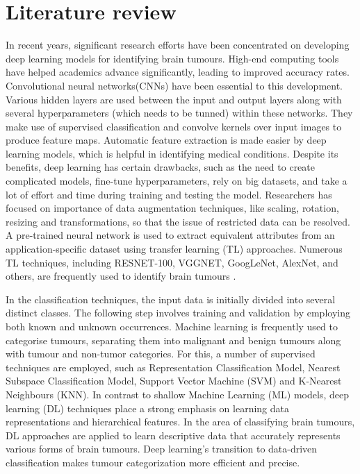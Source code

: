 \documentclass[12pt, a4paper,twoside]{report}
\theoremstyle{plain} %
\theoremstyle{definition} %
\theoremstyle{remark} %
\numberwithin{equation}{chapter}
\begin{document}
\chapter{Literature review}\label{ch:2}

In recent years, significant research efforts have been concentrated on developing deep learning models for identifying brain tumours. High-end computing tools have helped academics advance significantly, leading to improved accuracy rates. Convolutional neural networks(CNNs) have been essential to this development. Various hidden layers are used between the input and output layers along with several hyperparameters (which needs to be tunned) within these networks. They make use of supervised classification and convolve kernels over input images to produce feature maps. Automatic feature extraction is made easier by deep learning models, which is helpful in identifying medical conditions. Despite its benefits, deep learning has certain drawbacks, such as the need to create complicated models, fine-tune hyperparameters, rely on big datasets, and take a lot of effort and time during training and testing the model. Researchers has focused on importance of data augmentation techniques, like scaling, rotation, resizing and transformations, so that the issue of restricted data can be resolved. A pre-trained neural network is used to extract equivalent attributes from an application-specific dataset using transfer learning (TL) approaches. Numerous TL techniques, including RESNET-100, VGGNET, GoogLeNet, AlexNet, and others, are frequently used to identify brain tumours \cite{lakshmi22}.

In the classification techniques, the input data is initially divided into several distinct classes. The following step involves training and validation by employing both known and unknown occurrences. Machine learning is frequently used to categorise tumours, separating them into malignant and benign tumours along with tumour and non-tumor categories. For this, a number of supervised techniques are employed, such as Representation Classification Model, Nearest Subspace Classification Model, Support Vector Machine (SVM) and K-Nearest Neighbours (KNN). In contrast to shallow Machine Learning (ML) models, deep learning (DL) techniques place a strong emphasis on learning data representations and hierarchical features. In the area of classifying brain tumours, DL approaches are applied to learn descriptive data that accurately represents various forms of brain tumours. Deep learning's transition to data-driven classification makes tumour categorization more efficient and precise. 
\end{document}
